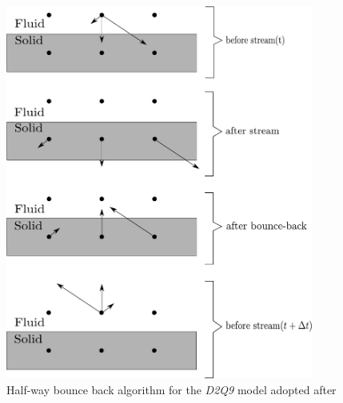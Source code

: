 \begin{figure}[htbp]
\centering
\includegraphics[width=0.9\textwidth]{bounce}
\caption[Half-way bounce back algorithm for the \textit{D2Q9} model ]{Half-way bounce back algorithm for the \textit{D2Q9} model adopted after \citet{Sukop2006}}
\label{fig:bounce}
\end{figure}

